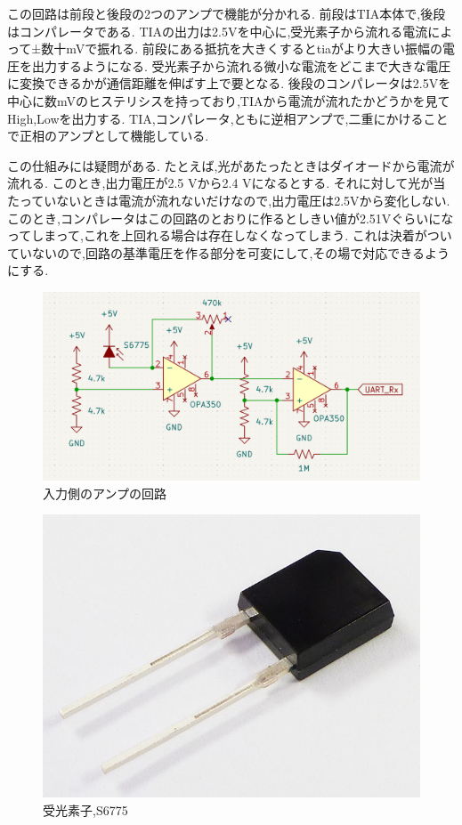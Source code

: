 \documentclass[a4paper,10pt]{article}
\begin{document}
\begin{multicols}{2}[\raggedcolumns]
この回路は前段と後段の2つのアンプで機能が分かれる.
前段はTIA本体で,後段はコンパレータである.
TIAの出力は2.5Vを中心に,受光素子から流れる電流によって±数十mVで振れる.
前段にある抵抗を大きくするとtiaがより大きい振幅の電圧を出力するようになる.
受光素子から流れる微小な電流をどこまで大きな電圧に変換できるかが通信距離を伸ばす上で要となる.
後段のコンパレータは2.5Vを中心に数mVのヒステリシスを持っており,TIAから電流が流れたかどうかを見てHigh,Lowを出力する.
TIA,コンパレータ,ともに逆相アンプで,二重にかけることで正相のアンプとして機能している.

この仕組みには疑問がある.
たとえば,光があたったときはダイオードから電流が流れる.
このとき,出力電圧が2.5 Vから2.4 Vになるとする.
それに対して光が当たっていないときは電流が流れないだけなので,出力電圧は2.5Vから変化しない.
このとき,コンパレータはこの回路のとおりに作るとしきい値が2.51Vぐらいになってしまって,これを上回れる場合は存在しなくなってしまう.
これは決着がついていないので,回路の基準電圧を作る部分を可変にして,その場で対応できるようにする.

\begin{figure}[H]
    \centering
    \includegraphics[width=1.4\linewidth,angle=270]{figure/tia.png} 
    \caption{入力側のアンプの回路} 
    \label{fig:tia}
\end{figure}

\begin{figure}[H]
    \centering
    \includegraphics[width=\linewidth]{figure/s6775.jpg} 
    \caption{受光素子,S6775} 
    \label{fig:s6775}
\end{figure}
\newpage

\end{multicols}
\end{document}
